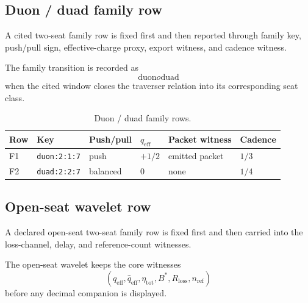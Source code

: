 \subsection{Duon / duad family row}
\label{man:duon-duad-family-row}
A cited two-seat family row is fixed first and then reported through family key, push/pull sign, effective-charge proxy, export witness, and cadence witness.\par\smallskip
{}

The family transition is recorded as
\[
\mathrm{duon}	o\mathrm{duad}
\]
when the cited window closes the traverser relation into its corresponding seat class.

\begin{table}[H]
\centering
\caption{Duon / duad family rows.}
\label{tab:manual-duon-duad-family}
\begin{threeparttable}
\small
\begin{tabular}{@{}llllll@{}}
\toprule
Row & Key & Push/pull & $q_{\mathrm{eff}}$ & Packet witness & Cadence \\
\midrule
F1 & \texttt{duon:2:1:7} & push & $+1/2$ & emitted packet & $1/3$ \\
F2 & \texttt{duad:2:2:7} & balanced & $0$ & none & $1/4$ \\
\bottomrule
\end{tabular}
\end{threeparttable}
\end{table}

\subsection{Open-seat wavelet row}
\label{man:open-seat-wavelet-row}
A declared open-seat two-seat family row is fixed first and then carried into the loss-channel, delay, and reference-count witnesses.\par\smallskip
{}

The open-seat wavelet keeps the core witnesses
\[
(q_{\mathrm{eff}},\widehat q_{\mathrm{eff}},\eta_{\mathrm{tot}},B^*,R_{\mathrm{loss}},n_{\mathrm{ref}})
\]
before any decimal companion is displayed.

